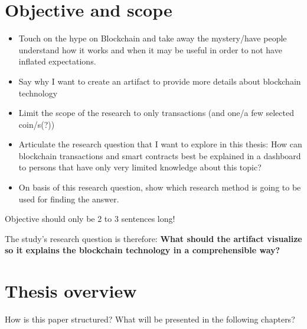 \section{Objective and scope} \label{sec:Objective}
\begin{itemize}
    \item Touch on the hype on Blockchain and take away the mystery/have people understand how it works and when it may be useful in order to not have inflated expectations.
    \item Say why I want to create an artifact to provide more details about blockchain technology
    \item Limit the scope of the research to only transactions (and one/a few selected coin/s(?))
    \item Articulate the research question that I want to explore in this thesis: How can blockchain transactions and smart contracts best be explained in a dashboard to persons that have only very limited knowledge about this topic?
    \item On basis of this research question, show which research method is going to be used for finding the answer.

\end{itemize}


    Objective should only be 2 to 3 sentences long!
    
    The study's research question is therefore: \textbf{What should the artifact visualize so it explains the blockchain technology in a comprehensible way?}
    
\section{Thesis overview} \label{sec:ThesisOverview}
How is this paper structured? What will be presented in the following chapters?


